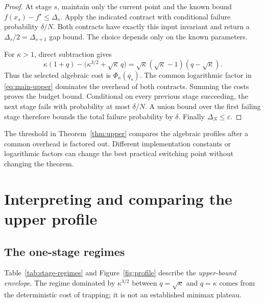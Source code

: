 \documentclass[11pt,a4paper]{article}
\newcommand{\eps}{\varepsilon}
\theoremstyle{definition}
\theoremstyle{remark}
\begin{document}
\begin{proof}
At stage $s$, maintain only the current point and the known bound
$f(x_s)-f^\star\le\Delta_s$.  Apply the indicated contract with
conditional failure probability $\delta/N$.
Both contracts have exactly this input invariant and return a
$\Delta_s/2=\Delta_{s+1}$ gap bound.  The choice depends only on
the known parameters.

For $\kappa>1$, direct subtraction gives
\begin{equation}
 \kappa(1+q)-\bigl(\kappa^{3/2}+\sqrt\kappa\,q\bigr)
 =\sqrt\kappa(\sqrt\kappa-1)(q-\sqrt\kappa).
 \label{eq:switching-threshold}
\end{equation}
Thus the selected algebraic cost is $\Phi_\kappa(q_s)$.
The common logarithmic factor in \eqref{eq:main-upper} dominates
the overhead of both contracts.  Summing the costs proves the
budget bound.  Conditional on every previous stage succeeding,
the next stage fails with probability at most $\delta/N$.
A union bound over the first failing stage therefore bounds the
total failure probability by $\delta$.
Finally $\Delta_N\le\eps$.
\end{proof}

The threshold in Theorem~\ref{thm:upper} compares the algebraic
profiles after a common overhead is factored out.  Different
implementation constants or logarithmic factors can change the
best practical switching point without changing the theorem.

\section{Interpreting and comparing the upper profile}
\label{sec:profile}

\subsection{The one-stage regimes}

Table~\ref{tab:stage-regimes} and Figure~\ref{fig:profile} describe
the \emph{upper-bound envelope}.  The regime dominated by
$\kappa^{3/2}$ between $q=\sqrt\kappa$ and $q=\kappa$ comes from the deterministic cost of
trapping; it is not an established minimax plateau.
\end{document}
